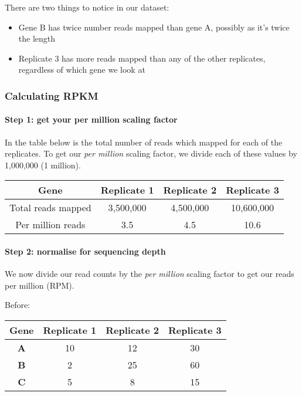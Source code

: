 \documentclass[11pt]{article}
\begin{document}
There are two things to notice in our dataset:

\begin{itemize}
\item
  Gene B has twice number reads mapped than gene A, possibly as it's
  twice the length
\item
  Replicate 3 has more reads mapped than any of the other replicates,
  regardless of which gene we look at
\end{itemize}

\hypertarget{calculating-rpkm}{%
\subsubsection{Calculating RPKM}\label{calculating-rpkm}}

\hypertarget{step-1-get-your-per-million-scaling-factor}{%
\paragraph{Step 1: get your per million scaling
factor}\label{step-1-get-your-per-million-scaling-factor}}

In the table below is the total number of reads which mapped for each of
the replicates. To get our \textit{per million} scaling factor, we divide
each of these values by 1,000,000 (1 million).

\begin{longtable}[]{@{}cccc@{}}
\hline
Gene & Replicate 1 & Replicate 2 & Replicate 3\tabularnewline
\hline
\endhead
Total reads mapped & 3,500,000 & 4,500,000 & 10,600,000\tabularnewline
Per million reads & 3.5 & 4.5 & 10.6\tabularnewline
\hline
\end{longtable}

\hypertarget{step-2-normalise-for-sequencing-depth}{%
\paragraph{Step 2: normalise for sequencing
depth}\label{step-2-normalise-for-sequencing-depth}}

We now divide our read counts by the \textit{per million} scaling factor
to get our reads per million (RPM).

Before:

\begin{longtable}[]{@{}cccc@{}}
\hline
Gene & Replicate 1 & Replicate 2 & Replicate 3\tabularnewline
\hline
\endhead
\textbf{A} & 10 & 12 & 30\tabularnewline
\textbf{B} & 2 & 25 & 60\tabularnewline
\textbf{C} & 5 & 8 & 15\tabularnewline
\hline
\end{longtable}
\end{document}
